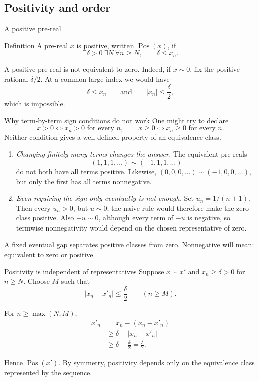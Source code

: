 \documentclass[aspectratio=169,11pt]{beamer}
\begin{document}
\subsection{Positivity and order}

\begin{frame}{A positive pre-real}
  \begin{block}{Definition}
    A pre-real \(x\) is \alert{positive}, written \(\operatorname{Pos}(x)\), if
    \[
      \exists\delta>0\ \exists N\ \forall n\ge N,
      \qquad \delta\le x_n.
    \]
  \end{block}

  A positive pre-real is not equivalent to zero.  Indeed, if \(x\sim0\),
  fix the positive rational \(\delta/2\).  At a common large index we would have
  \[
    \delta\le x_n
    \qquad\text{and}\qquad
    |x_n|\le\frac\delta2,
  \]
  which is impossible.
\end{frame}

\begin{frame}{Why term-by-term sign conditions do not work}
  \small
  One might try to declare
  \[
    x>0\iff x_n>0\text{ for every }n,
    \qquad
    x\ge0\iff x_n\ge0\text{ for every }n.
  \]
  Neither condition gives a well-defined property of an equivalence class.

  \begin{enumerate}
    \item \emph{Changing finitely many terms changes the answer.}
      The equivalent pre-reals
      \[
        (1,1,1,\ldots)\sim(-1,1,1,\ldots)
      \]
      do not both have all terms positive.  Likewise,
      \((0,0,0,\ldots)\sim(-1,0,0,\ldots)\), but only the first has all
      terms nonnegative.

    \item \emph{Even requiring the sign only eventually is not enough.}
      Set \(u_n=1/(n+1)\).  Then every \(u_n>0\), but \(u\sim0\); the naive
      rule would therefore make the zero class positive.  Also \(-u\sim0\),
      although every term of \(-u\) is negative, so termwise nonnegativity
      would depend on the chosen representative of zero.
  \end{enumerate}

  A fixed eventual gap separates positive classes from zero.  Nonnegative
  will mean: equivalent to zero or positive.
\end{frame}

\begin{frame}{Positivity is independent of representatives}
  Suppose \(x\sim x'\) and \(x_n\ge\delta>0\) for \(n\ge N\).  Choose \(M\)
  such that
  \[
    |x_n-x'_n|\le\frac\delta2
    \qquad(n\ge M).
  \]

  For \(n\ge\max(N,M)\),
  \begin{align*}
    x'_n
      &=x_n-(x_n-x'_n)\\
      &\ge\delta-|x_n-x'_n|\\
      &\ge\delta-\frac\delta2=\frac\delta2.
  \end{align*}

  Hence \(\operatorname{Pos}(x')\).  By symmetry, positivity depends only on
  the equivalence class represented by the sequence.
\end{frame}
\end{document}
